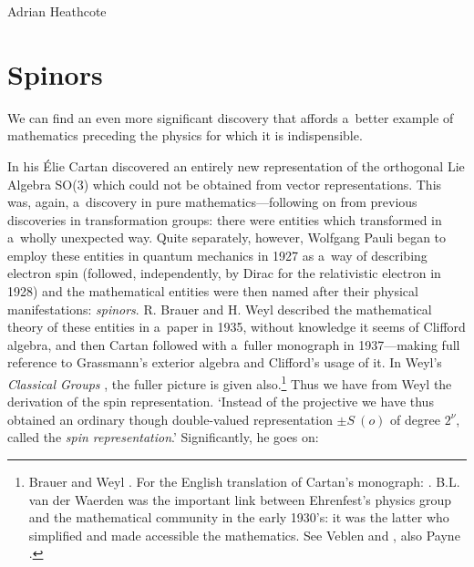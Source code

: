 \begin{artengenv}{Adrian Heathcote}
\section{Spinors}

We can find an even more significant discovery that affords a~better example of mathematics preceding the physics for which it is indispensible.

In his \parencite*{cartan_les_1913} Élie Cartan discovered an entirely new representation of the orthogonal Lie Algebra SO(3) which could not be obtained from vector representations. This was, again, a~discovery in pure mathematics---following on from previous discoveries in transformation groups: there were entities which transformed in a~wholly unexpected way. Quite separately, however, Wolfgang Pauli began to employ these entities in quantum mechanics in 1927 as a~way of describing electron spin (followed, independently, by Dirac for the relativistic electron in 1928) and the mathematical entities were then named after their physical manifestations: \textit{spinors}. R. Brauer and H. Weyl described the mathematical theory of these entities in a~paper in 1935, without knowledge it seems of Clifford algebra, and then Cartan followed with a~fuller monograph in 1937---making full reference to Grassmann's exterior algebra and Clifford's usage of it. In Weyl's \textit{Classical Groups} \parencite*{weyl_classical_1939}, the fuller picture is given also.\footnote{Brauer and Weyl \parencite*[425--449]{brauer_spinors_1935}. For the English translation of Cartan's monograph: \parencite{cartan_theory_1966}. B.L. van der Waerden was the important link between Ehrenfest's physics group and the mathematical community in the early 1930's: it was the latter who simplified and made accessible the mathematics. See Veblen \parencite*{veblen_geometry_1933} and \parencite*{veblen_spinors_1934}, also Payne \parencite*{payne_elementary_1952}.}
Thus we have from Weyl \parencite*{weyl_classical_1939} the derivation of the spin representation. `Instead of the projective we have thus obtained an ordinary though double-valued representation $ \pm S~(o)$ of degree $2^{\nu}$, called the \textit{spin representation}.' Significantly, he goes on:  %


\end{artengenv}
